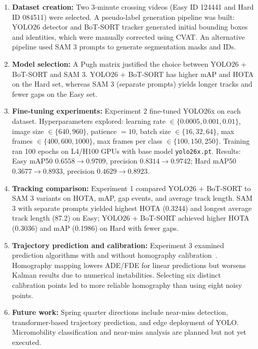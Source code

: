 \documentclass[12pt,letterpaper]{article}
\begin{document}
\begin{enumerate}
    \item \textbf{Dataset creation:} Two 3-minute crossing videos (Easy ID 124441 and Hard ID 084511) were selected. A pseudo-label generation pipeline was built: YOLO26 detector and BoT-SORT tracker generated initial bounding boxes and identities, which were manually corrected using CVAT. An alternative pipeline used SAM 3 prompts to generate segmentation masks and IDs.

    \item \textbf{Model selection:} A Pugh matrix justified the choice between YOLO26 + BoT-SORT and SAM 3. YOLO26 + BoT-SORT has higher mAP and HOTA on the Hard set, whereas SAM 3 (separate prompts) yields longer tracks and fewer gaps on the Easy set.

    \item \textbf{Fine-tuning experiments:} Experiment 2 fine-tuned YOLO26x on each dataset. Hyperparameters explored: learning rate $\in \{0.0005, 0.001, 0.01\}$, image size $\in \{640, 960\}$, patience $= 10$, batch size $\in \{16, 32, 64\}$, max frames $\in \{400, 600, 1000\}$, max frames per class $\in \{100, 150, 250\}$. Training ran 100 epochs on L4/H100 GPUs with base model \texttt{yolo26x.pt}. Results: Easy mAP50 $0.6558 \to 0.9709$, precision $0.8314 \to 0.9742$; Hard mAP50 $0.3677 \to 0.8933$, precision $0.4629 \to 0.8923$.

    \item \textbf{Tracking comparison:} Experiment 1 compared YOLO26 + BoT-SORT to SAM 3 variants on HOTA, mAP, gap events, and average track length. SAM 3 with separate prompts yielded highest HOTA (0.3244) and longest average track length (87.2) on Easy; YOLO26 + BoT-SORT achieved higher HOTA (0.3036) and mAP (0.1986) on Hard with fewer gaps.

    \item \textbf{Trajectory prediction and calibration:} Experiment 3 examined prediction algorithms with and without homography calibration~\cite{kalman,hartley}. Homography mapping lowers ADE/FDE for linear predictions but worsens Kalman results due to numerical instabilities. Selecting six distinct calibration points led to more reliable homography than using eight noisy points.

    \item \textbf{Future work:} Spring quarter directions include near-miss detection, transformer-based trajectory prediction, and edge deployment of YOLO. Micromobility classification and near-miss analysis are planned but not yet executed.
\end{enumerate}
\end{document}
